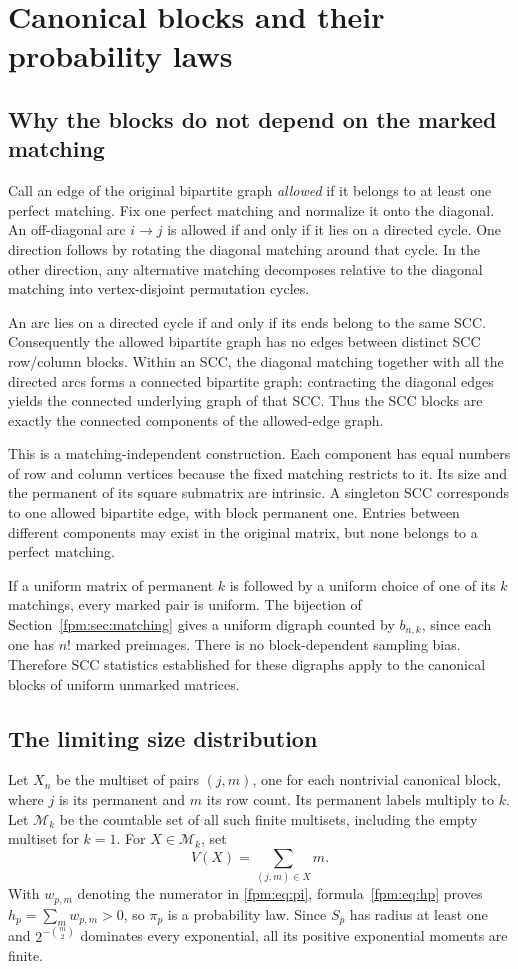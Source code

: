\documentclass[11pt]{article}
\theoremstyle{definition}\newtheorem{definition}[theorem]{Definition}
\theoremstyle{remark}\newtheorem{remark}[theorem]{Remark}
\begin{document}
\section{Canonical blocks and their probability laws}\label{fpm:sec:blocks}
\subsection{Why the blocks do not depend on the marked matching}
Call an edge of the original bipartite graph \emph{allowed} if it belongs to at least one perfect matching. Fix one perfect matching and normalize it onto the diagonal. An off-diagonal arc $i\to j$ is allowed if and only if it lies on a directed cycle. One direction follows by rotating the diagonal matching around that cycle. In the other direction, any alternative matching decomposes relative to the diagonal matching into vertex-disjoint permutation cycles.

An arc lies on a directed cycle if and only if its ends belong to the same SCC. Consequently the allowed bipartite graph has no edges between distinct SCC row/column blocks. Within an SCC, the diagonal matching together with all the directed arcs forms a connected bipartite graph: contracting the diagonal edges yields the connected underlying graph of that SCC. Thus the SCC blocks are exactly the connected components of the allowed-edge graph.

This is a matching-independent construction. Each component has equal numbers of row and column vertices because the fixed matching restricts to it. Its size and the permanent of its square submatrix are intrinsic. A singleton SCC corresponds to one allowed bipartite edge, with block permanent one. Entries between different components may exist in the original matrix, but none belongs to a perfect matching.

If a uniform matrix of permanent $k$ is followed by a uniform choice of one of its $k$ matchings, every marked pair is uniform. The bijection of Section~\ref{fpm:sec:matching} gives a uniform digraph counted by $b_{n,k}$, since each one has $n!$ marked preimages. There is no block-dependent sampling bias. Therefore SCC statistics established for these digraphs apply to the canonical blocks of uniform unmarked matrices.

\subsection{The limiting size distribution}
Let $X_n$ be the multiset of pairs $(j,m)$, one for each nontrivial canonical block, where $j$ is its permanent and $m$ its row count. Its permanent labels multiply to $k$. Let $\mathcal M_k$ be the countable set of all such finite multisets, including the empty multiset for $k=1$. For $X\in\mathcal M_k$, set
\[
 V(X)=\sum_{(j,m)\in X}m.
\]
With $w_{p,m}$ denoting the numerator in \eqref{fpm:eq:pi}, formula~\eqref{fpm:eq:hp} proves $h_p=\sum_m w_{p,m}>0$, so $\pi_p$ is a probability law. Since $S_p$ has radius at least one and $2^{-\binom m2}$ dominates every exponential, all its positive exponential moments are finite.
\end{document}
